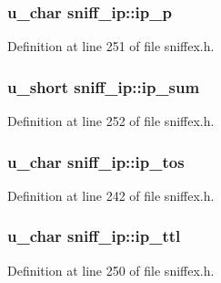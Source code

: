 \subsubsection[{\texorpdfstring{ip\+\_\+p}{ip_p}}]{\setlength{\rightskip}{0pt plus 5cm}u\+\_\+char sniff\+\_\+ip\+::ip\+\_\+p}\hypertarget{structsniff__ip_a49d22326de644e4d1158ef7ae4fb22b7}{}\label{structsniff__ip_a49d22326de644e4d1158ef7ae4fb22b7}


Definition at line 251 of file sniffex.\+h.

\subsubsection[{\texorpdfstring{ip\+\_\+sum}{ip_sum}}]{\setlength{\rightskip}{0pt plus 5cm}u\+\_\+short sniff\+\_\+ip\+::ip\+\_\+sum}\hypertarget{structsniff__ip_a263384b09865cda4a03e3451de740c84}{}\label{structsniff__ip_a263384b09865cda4a03e3451de740c84}


Definition at line 252 of file sniffex.\+h.

\subsubsection[{\texorpdfstring{ip\+\_\+tos}{ip_tos}}]{\setlength{\rightskip}{0pt plus 5cm}u\+\_\+char sniff\+\_\+ip\+::ip\+\_\+tos}\hypertarget{structsniff__ip_aa850a52985272f13d6866d14be1ecdf6}{}\label{structsniff__ip_aa850a52985272f13d6866d14be1ecdf6}


Definition at line 242 of file sniffex.\+h.

\subsubsection[{\texorpdfstring{ip\+\_\+ttl}{ip_ttl}}]{\setlength{\rightskip}{0pt plus 5cm}u\+\_\+char sniff\+\_\+ip\+::ip\+\_\+ttl}\hypertarget{structsniff__ip_abed391544944e353d09e85030f423ec8}{}\label{structsniff__ip_abed391544944e353d09e85030f423ec8}


Definition at line 250 of file sniffex.\+h.

